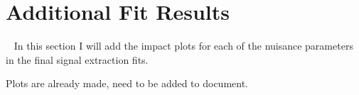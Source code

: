 \chapter{Additional Fit Results}~\label{ch:fitpulls}
In this section I will add the impact plots for each of the nuisance parameters in the final signal extraction fits. 

Plots are already made, need to be added to document.